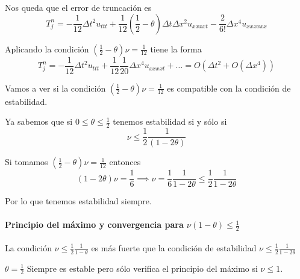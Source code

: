 Nos queda que el error de truncación es
$$T_j^n = -\frac{1}{12}\Delta t^2 u_{ttt} + \frac{1}{12}\left(\frac{1}{2}-\theta\right)\Delta t \Delta x^2u_{xxxxt}
-\frac{2}{6!}\Delta x^4 u_{xxxxxx}$$

Aplicando la condición $\left(\frac{1}{2}-\theta\right)\nu = \frac{1}{12}$ tiene la forma
$$T_j^n = -\frac{1}{12}\Delta t^2  u_{ttt} +\frac{1}{12}\frac{1}{20}\Delta x^4u_{xxxxt} +\hdots
= O(\Delta t^2 + O(\Delta x ^4))$$

Vamos a ver si la condición $\left(\frac{1}{2}-\theta\right)\nu = \frac{1}{12}$ es compatible con la condición de estabilidad.

Ya sabemos que si $0\le\theta\le\frac{1}{2}$ tenemos estabilidad si y sólo si $$\nu\le\frac{1}{2}\frac{1}{(1-2\theta)}$$

Si tomamos $(\frac{1}{2}-\theta)\nu = \frac{1}{12}$ entonces
$$ (1-2\theta)\nu=\frac{1}{6}\implies \nu=\frac{1}{6}\frac{1}{1-2\theta}\le\frac{1}{2}\frac{1}{1-2\theta}$$

Por lo que tenemos estabilidad siempre.

\paragraph{Principio del máximo y convergencia para $\nu(1-\theta) \le \frac{1}{2}$}\mbox{}

\begin{obs}
	La condición $\nu\le\frac{1}{2}\frac{1}{1-\theta}$
	es más fuerte que la condición de estabilidad $\nu\le\frac{1}{2}\frac{1}{1-2\theta}$
\end{obs}

\begin{example} $\theta = \frac{1}{2}$ Siempre es estable pero sólo verifica el principio del máximo si $\nu\le 1$.
\end{example}

